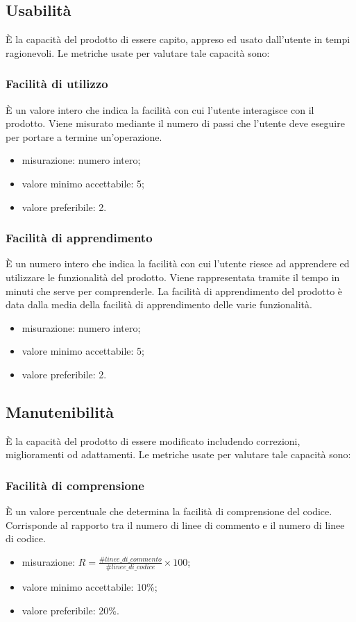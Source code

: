 \subsection{Usabilità}
È la capacità del prodotto di essere capito, appreso ed usato dall'utente in tempi ragionevoli.
Le metriche usate per valutare tale capacità sono:

	\subsubsection*{Facilità di utilizzo}
	È un valore intero che indica la facilità con cui l'utente interagisce con il prodotto. Viene misurato mediante il numero di passi che l'utente deve eseguire per portare a termine un'operazione.
	\begin{itemize}
		\item {misurazione: numero intero;}
		\item {valore minimo accettabile: 5;}
		\item {valore preferibile: 2.}
		\end{itemize}
		
	\subsubsection*{Facilità di apprendimento}
	È un numero intero che indica la facilità con cui l'utente riesce ad apprendere ed utilizzare le funzionalità del prodotto. Viene rappresentata tramite il tempo in minuti che serve per comprenderle. La facilità di apprendimento del prodotto è data dalla media della facilità di apprendimento delle varie funzionalità.
	\begin{itemize}
		\item {misurazione: numero intero;}
		\item {valore minimo accettabile: 5;}
		\item {valore preferibile: 2.}
	\end{itemize}
	
\subsection{Manutenibilità}
È la capacità del prodotto di essere modificato includendo correzioni, miglioramenti od adattamenti. 
Le metriche usate per valutare tale capacità sono:

	\subsubsection*{Facilità di comprensione}
	È un valore percentuale che determina la facilità di comprensione del codice. Corrisponde al rapporto tra il numero di linee di commento e il numero di linee di codice.
	\begin{itemize}
		\item{misurazione: $R = \displaystyle\frac{\#linee\_di\_commento}{\#linee\_di\_codice}\times100$;}
		\item {valore minimo accettabile: 10\%;}
		\item {valore preferibile: 20\%.}
	\end{itemize}
	
